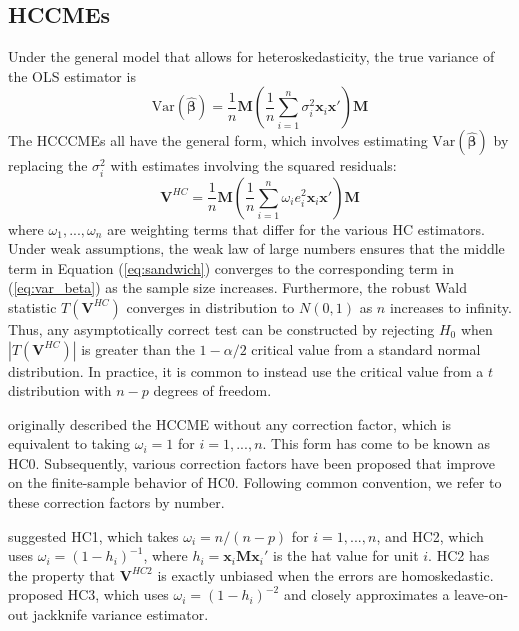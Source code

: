 \documentclass[12pt]{article}\usepackage[]{graphicx}\usepackage[]{color}
\newcommand{\Var}{\text{Var}}
\newcommand{\bm}{\mathbf}
\newcommand{\bs}{\boldsymbol}
\begin{document}
\subsection{HCCMEs}

Under the general model that allows for heteroskedasticity, the true variance of the OLS estimator is 
\begin{equation}
\label{eq:var_beta}
\Var\left(\bs{\hat\beta}\right) = \frac{1}{n} \bm{M} \left(\frac{1}{n}\sum_{i=1}^n \sigma_i^2 \bm{x}_i\bm{x}'\right) \bm{M}
\end{equation}
The HCCCMEs all have the general form, which involves estimating $\Var\left(\bs{\hat\beta}\right)$ by replacing the $\sigma_i^2$ with estimates involving the squared residuals:
\begin{equation}
\label{eq:sandwich}
\bm{V}^{HC} = \frac{1}{n} \bm{M} \left(\frac{1}{n}\sum_{i=1}^n \omega_i e_i^2 \bm{x}_i\bm{x}'\right)\bm{M} 
\end{equation}
where $\omega_{1},...,\omega_{n}$ are weighting terms that differ for the various HC estimators. 
Under weak assumptions, the weak law of large numbers ensures that the middle term in Equation (\ref{eq:sandwich}) converges to the corresponding term in (\ref{eq:var_beta}) as the sample size increases. 
Furthermore, the robust Wald statistic $T\left(\bm{V}^{HC}\right)$ converges in distribution to $N(0,1)$ as $n$ increases to infinity. 
Thus, any asymptotically correct test can be constructed by rejecting $H_0$ when $\left|T\left(\bm{V}^{HC}\right)\right|$ is greater than the $1 - \alpha / 2$ critical value from a standard normal distribution. 
In practice, it is common to instead use the critical value from a $t$ distribution with $n - p$ degrees of freedom.

\citet{White1980heteroskedasticity} originally described the HCCME without any correction factor, which is equivalent to taking $\omega_i = 1$ for $i = 1,...,n$. 
This form has come to be known as HC0. 
Subsequently, various correction factors have been proposed that improve on the finite-sample behavior of HC0. 
Following common convention, we refer to these correction factors by number. 

\citet{MacKinnon1985some} suggested HC1, which takes $\omega_i = n / (n - p)$ for $i = 1,...,n$, and HC2, which uses $\omega_i = \left(1 - h_i\right)^{-1}$, where $h_i = \bm{x}_i \bm{M} \bm{x}_i'$ is the hat value for unit $i$. 
HC2 has the property that $\bm{V}^{HC2}$ is exactly unbiased when the errors are homoskedastic. 
\citet{Davidson1993estimation} proposed HC3, which uses $\omega_i =  \left(1 - h_i\right)^{-2}$ and closely approximates a leave-on-out jackknife variance estimator. 
\end{document}
